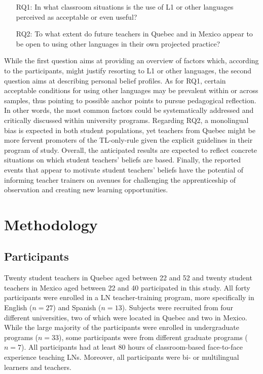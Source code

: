 \documentclass[output=paper]{../langscibook}
\begin{document}
\begin{itemize}
\item [RQ1:] In what classroom situations is the use of L1 or other languages perceived as acceptable or even useful?
\item [RQ2:] To what extent do future teachers in Quebec and in Mexico appear to be open to using other languages in their own projected practice?
\end{itemize}



While the first question aims at providing an overview of factors which, according to the participants, might justify resorting to L1 or other languages, the second question aims at describing personal belief profiles. As for RQ1, certain acceptable conditions for using other languages may be prevalent within or across samples, thus pointing to possible anchor points to pursue pedagogical reflection. In other words, the most common factors could be systematically addressed and critically discussed within university programs. Regarding RQ2, a monolingual bias is expected in both student populations, yet teachers from Quebec might be more fervent promoters of the TL-only-rule given the explicit guidelines in their program of study. Overall, the anticipated results are expected to reflect concrete situations on which student teachers’ beliefs are based. Finally, the reported events that appear to motivate student teachers’ beliefs have the potential of informing teacher trainers on avenues for challenging the apprenticeship of observation and creating new learning opportunities.


\section{Methodology}
\subsection{Participants}
Twenty student teachers in Quebec aged between 22 and 52 and twenty student teachers in Mexico aged between 22 and 40 participated in this study. All forty participants were enrolled in a LN teacher-training program, more specifically in English ($n=27$) and Spanish ($n=13$). Subjects were recruited from four different universities, two of which were located in Quebec and two in Mexico. While the large majority of the participants were enrolled in undergraduate programs ($n=33$), some participants were from different graduate programs ($n=7$). All participants had at least 80 hours of classroom-based face-to-face experience teaching LNs. Moreover, all participants were bi- or multilingual learners and teachers.
\end{document}
